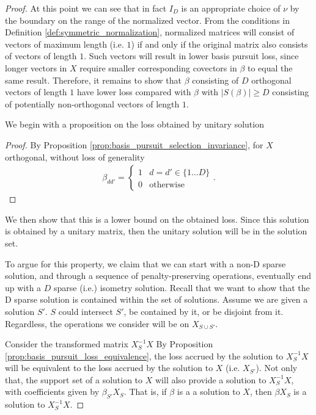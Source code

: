 \begin{proof}
At this point we can see that in fact $I_D$ is an appropriate choice of $\nu$ by the boundary on the range of the normalized vector.
From the conditions in Definition \ref{def:symmetric_normalization}, normalized matrices will consist of vectors of maximum length (i.e. $1$) if and only if the original matrix also consists of vectors of length $1$.
Such vectors will result in lower basis pursuit loss, since longer vectors in $X$ require smaller corresponding covectors in $\beta$ to equal the same result.
Therefore, it remains to show that $\beta$ consisting of $D$ orthogonal vectors of length $1$ have lower loss compared with $\beta$ with $|S(\beta)| \geq D$ consisting of potentially non-orthogonal vectors of length $1$.

We begin with a proposition on the loss obtained by unitary solution
\begin{proposition}
\label{prop:minimum_loss}
Given a rank $D$ (i.e. invertible) matrix $X_S \in \mathbb R^{D \times D}, (\|\beta\|_{1,2} : \beta = X_S^{-1)) = D$
The value of $D$ is  obtained by $\beta$ orthonormal.
\end{proposition}
\begin{proof}
By Proposition \ref{prop:basis_pursuit_selection_invariance}, for $X$ orthogonal, without loss of generality 
\begin{align}
\beta_{dd'} = \begin{cases} 1 & d = d' \in \{ 1 \dots D\}  \\
0 & \text{otherwise}
\end{cases}.
\end{align}
\end{proof}

We then show that this is a lower bound on the obtained loss.
Since this solution is obtained by a unitary matrix, then the unitary solution will be in the solution set.

To argue for this property, we claim that we can start with a non-D sparse solution, and through a sequence of penalty-preserving operations, eventually end up with a $D$ sparse (i.e.) isometry solution.
Recall that we want to show that the D sparse solution is contained within the set of solutions.
Assume we are given a solution $S'$. %
$S$ could intersect $S'$, be contained by it, or be disjoint from it.
Regardless, the operations we consider will be on $X_{S \cup S'}$.

Consider the transformed matrix $X_S^{-1} X$
By Proposition \ref{prop:basis_pursuit_loss_equivalence}, the loss accrued by the solution to $X_S^{-1} X$ will be equivalent to the loss accrued by the solution to $X$ (i.e. $X_{S'}$).
Not only that, the support set of a solution to $X$ will also provide a solution to $X_{S}^{-1} X$, with coefficients given by $\beta_{S'} X_S$.
That is, if $\beta$ is a a solution to $X$, then $\beta X_S$ is a solution to $X_S^{-1} X$.


\end{proof}
